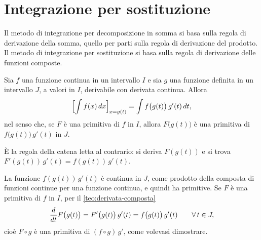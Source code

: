 \section{Integrazione per sostituzione}
\label{sec:sostituzione}

Il metodo di integrazione per decomposizione in somma si basa sulla regola di
derivazione della somma, quello per parti sulla regola di derivazione del prodotto. Il
metodo di integrazione per sostituzione si basa sulla regola di derivazione delle
funzioni composte.

\begin{teorema}\label{teo:sostituzione}
Sia $f$ una funzione continua in un intervallo $I$ e sia $g$ una funzione definita in un
intervallo $J$, a valori in $I$, derivabile con derivata continua. Allora
\begin{equation}\label{eq:sostituzione}
  \Bigl[\int f(x)\,dx\Bigr]_{x=g(t)}=\int f\bigl(g(t)\bigr)\,g'(t)\,dt ,
\end{equation}
nel senso che, se $F$ è una primitiva di $f$ in $I$, allora $F\bigl(g(t)\bigr)$ è una
primitiva di $f\bigl(g(t)\bigr)\,g'(t)$ in $J$.
\end{teorema}

\begin{schema}
\end{schema}

\begin{strategia}
È la regola della catena letta al contrario: si deriva $F(g(t))$ e si trova
$F'(g(t))\,g'(t)=f(g(t))\,g'(t)$.
\end{strategia}

\begin{dimostrazione}
La funzione $f(g(t))\,g'(t)$ è continua in $J$, come prodotto della composta di funzioni
continue per una funzione continua, e quindi ha primitive. Se $F$ è una primitiva di $f$
in $I$, per il \cref{teo:derivata-composta}
\[
  \frac{d}{dt}F\bigl(g(t)\bigr)=F'\bigl(g(t)\bigr)\,g'(t)=f\bigl(g(t)\bigr)\,g'(t)
  \qquad\forall\, t\in J ,
\]
cioè $F\circ g$ è una primitiva di $(f\circ g)\,g'$, come volevasi dimostrare.
\end{dimostrazione}


